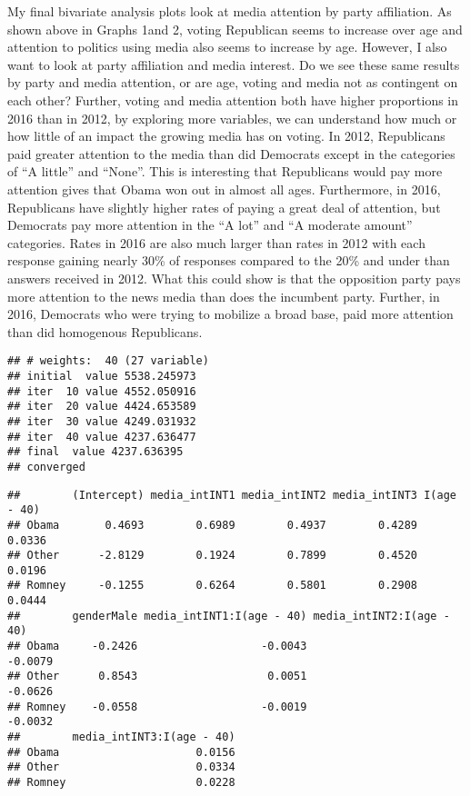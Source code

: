 \documentclass[11pt,]{article}
\begin{document}
My final bivariate analysis plots look at media attention by party
affiliation. As shown above in Graphs 1and 2, voting Republican seems to
increase over age and attention to politics using media also seems to
increase by age. However, I also want to look at party affiliation and
media interest. Do we see these same results by party and media
attention, or are age, voting and media not as contingent on each other?
Further, voting and media attention both have higher proportions in 2016
than in 2012, by exploring more variables, we can understand how much or
how little of an impact the growing media has on voting. In 2012,
Republicans paid greater attention to the media than did Democrats
except in the categories of ``A little'' and ``None''. This is
interesting that Republicans would pay more attention gives that Obama
won out in almost all ages. Furthermore, in 2016, Republicans have
slightly higher rates of paying a great deal of attention, but Democrats
pay more attention in the ``A lot'' and ``A moderate amount''
categories. Rates in 2016 are also much larger than rates in 2012 with
each response gaining nearly 30\% of responses compared to the 20\% and
under than answers received in 2012. What this could show is that the
opposition party pays more attention to the news media than does the
incumbent party. Further, in 2016, Democrats who were trying to mobilize
a broad base, paid more attention than did homogenous Republicans.

\begin{verbatim}
## # weights:  40 (27 variable)
## initial  value 5538.245973 
## iter  10 value 4552.050916
## iter  20 value 4424.653589
## iter  30 value 4249.031932
## iter  40 value 4237.636477
## final  value 4237.636395 
## converged
\end{verbatim}

\begin{verbatim}
##        (Intercept) media_intINT1 media_intINT2 media_intINT3 I(age - 40)
## Obama       0.4693        0.6989        0.4937        0.4289      0.0336
## Other      -2.8129        0.1924        0.7899        0.4520      0.0196
## Romney     -0.1255        0.6264        0.5801        0.2908      0.0444
##        genderMale media_intINT1:I(age - 40) media_intINT2:I(age - 40)
## Obama     -0.2426                   -0.0043                   -0.0079
## Other      0.8543                    0.0051                   -0.0626
## Romney    -0.0558                   -0.0019                   -0.0032
##        media_intINT3:I(age - 40)
## Obama                     0.0156
## Other                     0.0334
## Romney                    0.0228
\end{verbatim}
\end{document}
